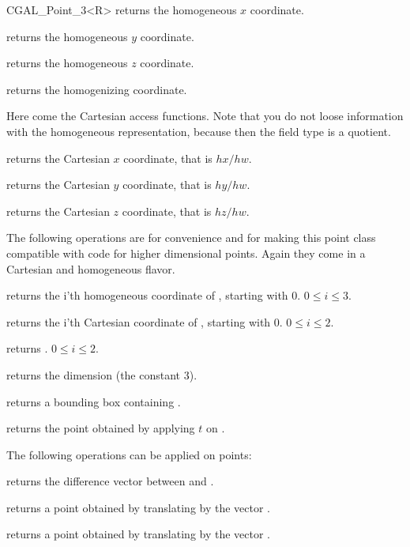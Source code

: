 \begin {classtemplate} {CGAL_Point_3<R>}
       {returns the homogeneous $x$ coordinate.}

       {returns the homogeneous $y$ coordinate.}

       {returns the homogeneous $z$ coordinate.}

       {returns the homogenizing  coordinate.}

Here come the Cartesian access functions. Note that you do not loose
information with the homogeneous representation, because then the field
type is a quotient.

       {returns the Cartesian $x$ coordinate, that is $hx/hw$.}

       {returns the Cartesian $y$ coordinate, that is $hy/hw$.}

       {returns the Cartesian $z$ coordinate, that is $hz/hw$.}


The following operations are for convenience and for making this
point class compatible with code for higher dimensional points.
Again they come in a Cartesian and homogeneous flavor.

       {returns the i'th homogeneous coordinate of \var, starting with 0.
        \precond $0\leq i \leq 3$.}

       {returns the i'th Cartesian coordinate of \var, starting with 0.
        \precond $0\leq i \leq 2$.}

       {returns .
        \precond $0\leq i \leq 2$.}

       {returns the dimension (the constant 3).}

       {returns a bounding box containing \var.}

       {returns the point obtained by applying $t$ on \var.}



The following operations can be applied on points:

       {returns the difference vector between  and .}

       {returns a point obtained by translating  by the 
        vector .}

       {returns a point obtained by translating  by the 
        vector .}


\end {classtemplate} 
%
%
%
